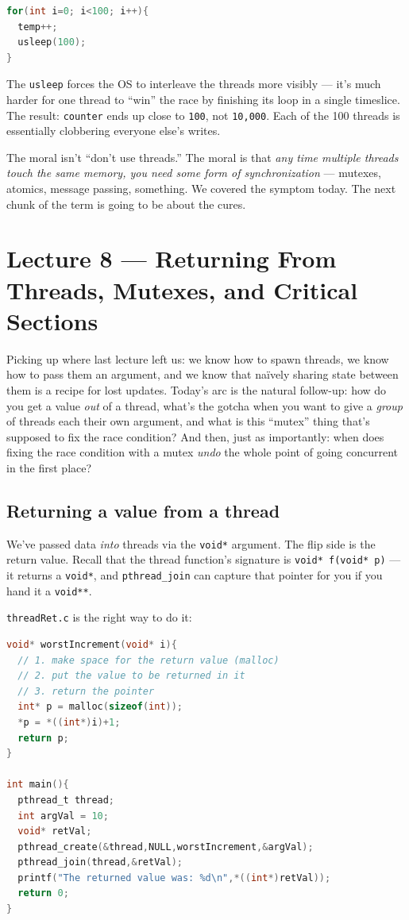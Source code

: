 \documentclass[11pt]{article}
\begin{document}
\begin{lstlisting}[language=C]
for(int i=0; i<100; i++){
  temp++;
  usleep(100);
}
\end{lstlisting}

The \texttt{usleep} forces the OS to interleave the threads more
visibly --- it's much harder for one thread to ``win'' the race by
finishing its loop in a single timeslice. The result: \texttt{counter}
ends up close to \texttt{100}, not \texttt{10{,}000}. Each of the 100
threads is essentially clobbering everyone else's writes.

The moral isn't ``don't use threads.'' The moral is that \emph{any
time multiple threads touch the same memory, you need some form of
synchronization} --- mutexes, atomics, message passing, something. We
covered the symptom today. The next chunk of the term is going to be
about the cures.

\section{Lecture 8 --- Returning From Threads, Mutexes, and Critical Sections}

Picking up where last lecture left us: we know how to spawn threads,
we know how to pass them an argument, and we know that na\"ively
sharing state between them is a recipe for lost updates. Today's arc
is the natural follow-up: how do you get a value \emph{out} of a
thread, what's the gotcha when you want to give a \emph{group} of
threads each their own argument, and what is this ``mutex'' thing
that's supposed to fix the race condition? And then, just as
importantly: when does fixing the race condition with a mutex
\emph{undo} the whole point of going concurrent in the first place?

\subsection*{Returning a value from a thread}

We've passed data \emph{into} threads via the \texttt{void*} argument.
The flip side is the return value. Recall that the thread function's
signature is \texttt{void* f(void* p)} --- it returns a \texttt{void*},
and \texttt{pthread\_join} can capture that pointer for you if you
hand it a \texttt{void**}.

\texttt{threadRet.c} is the right way to do it:

\begin{lstlisting}[language=C]
void* worstIncrement(void* i){
  // 1. make space for the return value (malloc)
  // 2. put the value to be returned in it
  // 3. return the pointer
  int* p = malloc(sizeof(int));
  *p = *((int*)i)+1;
  return p;
}

int main(){
  pthread_t thread;
  int argVal = 10;
  void* retVal;
  pthread_create(&thread,NULL,worstIncrement,&argVal);
  pthread_join(thread,&retVal);
  printf("The returned value was: %d\n",*((int*)retVal));
  return 0;
}
\end{lstlisting}
\end{document}
